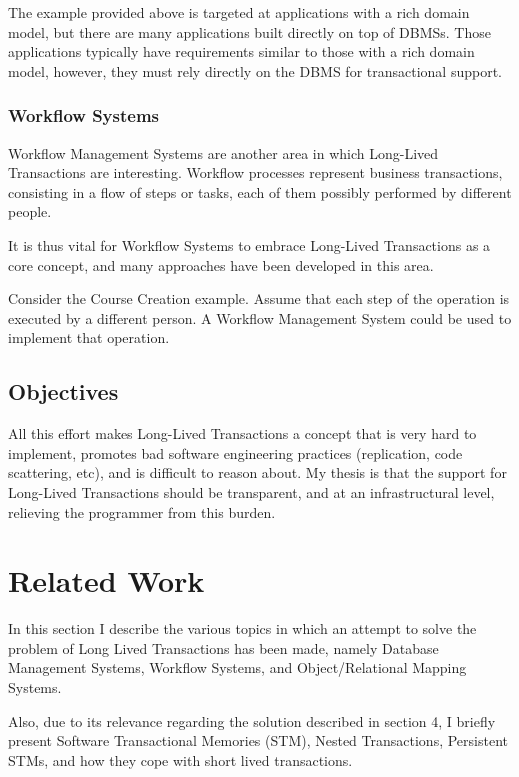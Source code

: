 \documentclass{llncs}
\begin{document}
The example provided above is targeted at applications with a rich
domain model, but there are many applications built directly on top of
DBMSs. Those applications typically have requirements similar to those
with a rich domain model, however, they must rely directly on the DBMS
for transactional support.

\subsubsection{Workflow Systems}

Workflow Management Systems are another area in which Long-Lived
Transactions are interesting. Workflow processes represent business
transactions, consisting in a flow of steps or tasks, each of them
possibly performed by different people.

It is thus vital for Workflow Systems to embrace Long-Lived
Transactions as a core concept, and many approaches have been
developed in this area.

Consider the Course Creation example. Assume that each step of the
operation is executed by a different person. A Workflow Management
System could be used to implement that operation.

\subsection{Objectives}

All this effort makes Long-Lived Transactions a concept that is very
hard to implement, promotes bad software engineering practices
(replication, code scattering, etc), and is difficult to reason
about. My thesis is that the support for Long-Lived Transactions
should be transparent, and at an infrastructural level, relieving the
programmer from this burden.

\section{Related Work}
\label{sec:related}

In this section I describe the various topics in which an attempt to
solve the problem of Long Lived Transactions has been made, namely
Database Management Systems, Workflow Systems, and Object/Relational
Mapping Systems.

Also, due to its relevance regarding the solution described in section
4, I briefly present Software Transactional Memories (STM), Nested
Transactions, Persistent STMs, and how they cope with short lived
transactions.
\end{document}
